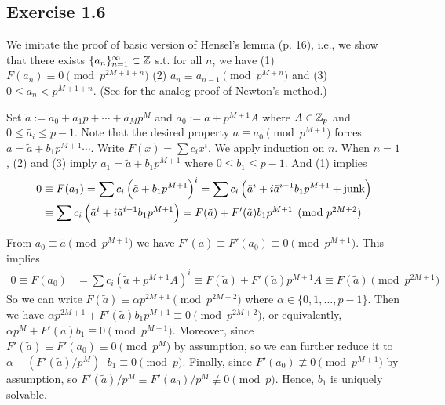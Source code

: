 \documentclass[../Koblitz.tex]{subfiles}
\begin{document}
\subsection*{Exercise 1.6}

We imitate the proof of basic version of Hensel's lemma (p. 16), i.e., we show that there exists $\{a_n\}_{n=1}^\infty\subset\mathbb{Z}$ s.t. for all $n$, we have (1) $F(a_n)\equiv0 \pmod{p^{2M+1+n}}$ (2) $a_n\equiv a_{n-1} \pmod{p^{M+n}}$ and (3) $0\leq a_n < p^{M+1+n}$. (See  for the analog proof of Newton's method.)

Set $\tilde{a}:=\tilde{a_0}+\tilde{a_1}p+\cdots+\tilde{a_M}p^M$ and $a_0 := \tilde{a} + p^{M+1}A$ where $A\in\mathbb{Z}_p$ and $0\leq\tilde{a_i}\leq p-1$. Note that the desired property $a\equiv a_0 \pmod{p^{M+1}}$ forces $a=\tilde{a}+b_1p^{M+1}\cdots$. Write $F(x)=\sum c_ix^i$. We apply induction on $n$. When $n=1$, (2) and (3) imply $a_1=\tilde{a}+b_1p^{M+1}$ where $0\leq b_1 \leq p-1$. And (1) implies
\begin{align*}
0 &\equiv F(a_1) = \sum c_i\left(\tilde{a}+b_1p^{M+1}\right)^i = \sum c_i\left(\tilde{a}^i+i\tilde{a}^{i-1}b_1p^{M+1}+\operatorname{junk}\right) \\
&\equiv \sum c_i\left(\tilde{a}^i+i\tilde{a}^{i-1}b_1p^{M+1}\right) = F(\tilde{a}) + F'(\tilde{a})b_1p^{M+1} \pmod{p^{2M+2}}
\end{align*}

From $a_0 \equiv \tilde{a} \pmod{p^{M+1}}$ we have $F'(\tilde{a})\equiv F'(a_0) \equiv 0 \pmod{p^{M+1}}$. This implies
\begin{align*}
0\equiv F(a_0) &= \sum c_i\left(\tilde{a} + p^{M+1}A\right)^i \equiv F(\tilde{a}) + F'(\tilde{a})p^{M+1}A \equiv F(\tilde{a}) \pmod{p^{2M+1}}
\end{align*}
So we can write $F(\tilde{a})\equiv \alpha p^{2M+1} \pmod{p^{2M+2}}$ where $\alpha\in\{0,1,\ldots,p-1\}$. Then we have $\alpha p^{2M+1} + F'(\tilde{a})b_1p^{M+1} \equiv 0 \pmod{p^{2M+2}}$, or equivalently, $\alpha p^M+F'(\tilde{a})b_1\equiv 0\pmod{p^{M+1}}$. Moreover, since $F'(\tilde{a})\equiv F'(a_0)\equiv 0 \pmod{p^M}$ by assumption, so we can further reduce it to $\alpha+(F'(\tilde{a})/p^M)\cdot b_1 \equiv 0\pmod{p}$. Finally, since $F'(a_0)\not\equiv 0 \pmod{p^{M+1}}$ by assumption, so $F'(\tilde{a})/p^M \equiv F'(a_0)/p^M\not\equiv 0 \pmod{p}$. Hence, $b_1$ is uniquely solvable.
\end{document}
